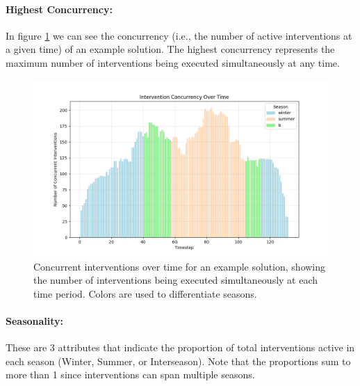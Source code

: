 \paragraph{Highest Concurrency:} In figure \ref{fig:concurrency} we can see the concurrency (i.e., the number of active interventions at a given time) of an example solution. The highest concurrency represents the maximum number of interventions being executed simultaneously at any time.

\begin{figure}[ht]
    \centering
    \includegraphics[width=\textwidth]{ch3/figures/Concurrency.png}
    \caption{Concurrent interventions over time for an example solution, showing the number of interventions being executed simultaneously at each time period. Colors are used to differentiate seasons.}
    \label{fig:concurrency}
\end{figure}







\paragraph{Seasonality:} These are 3 attributes that indicate the proportion of total interventions active in each season (Winter, Summer, or Interseason). Note that the proportions sum to more than 1 since interventions can span multiple seasons.